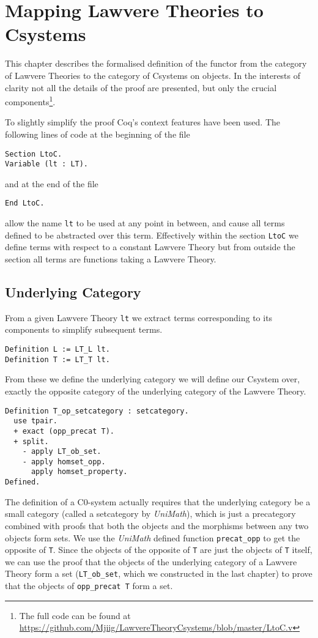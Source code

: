 \chapter{Mapping Lawvere Theories to Csystems}
This chapter describes the formalised definition of the functor from the
category of Lawvere Theories to the category of Csystems on objects. In the
interests of clarity not all the details of the proof are presented, but only
the crucial components\footnote{The full code can be found at
\url{https://github.com/Mjiig/LawvereTheoryCsystems/blob/master/LtoC.v}}.

To slightly simplify the proof Coq's context features\cite{coq} have been used.
The following lines of code at the beginning of the file
\begin{lstlisting}
Section LtoC.
Variable (lt : LT).
\end{lstlisting}
and at the end of the file
\begin{lstlisting}
End LtoC.
\end{lstlisting}
allow the name \lstinline|lt| to be used at any point in between, and cause all terms
defined to be abstracted over this term. Effectively within the section
\lstinline|LtoC| we define terms with respect to a constant Lawvere Theory but from
outside the section all terms are functions taking a Lawvere Theory.

\section{Underlying Category}
From a given Lawvere Theory \lstinline|lt| we extract terms corresponding to its
components to simplify subsequent terms.
\begin{lstlisting}
Definition L := LT_L lt.
Definition T := LT_T lt.
\end{lstlisting}

From these we define the underlying category we will define our Csystem over,
exactly the opposite category of the underlying category of the Lawvere Theory.
\begin{lstlisting}
Definition T_op_setcategory : setcategory.
  use tpair.
  + exact (opp_precat T).
  + split.
    - apply LT_ob_set.
    - apply homset_opp.
      apply homset_property.
Defined.
\end{lstlisting}
The definition of a C0-system actually requires that the underlying category be
a small category (called a setcategory by \textit{UniMath}), which is just a
precategory combined with proofs that both the objects and the morphisms between
any two objects form sets. We use the \textit{UniMath} defined function
\lstinline|precat_opp| to get the opposite of \lstinline|T|. Since the objects of the
opposite of \lstinline|T| are just the objects of \lstinline|T| itself, we can use the
proof that the objects of the underlying category of a Lawvere Theory form a set
(\lstinline|LT_ob_set|, which we constructed in the last chapter) to prove that the
objects of \lstinline|opp_precat T| form a set. 

